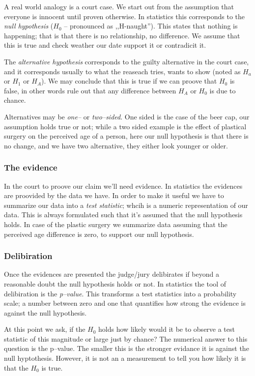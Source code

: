 A real world analogy is a court case. We start out from the assumption that
everyone is innocent until proven otherwise. In statistics this corresponds to
the \emph{null hypothesis}  ($H_0$ -- pronounced as ,,H-naught''). This states
that nothing is happening; that is that there is no relationship, no difference.
We assume that this is true and check weather our date support it or contradicit
it.

The \emph{alternative hypothesis} corresponds to the guilty alternative in the
court case, and it corresponds usually to what the reaseach tries, wants to
show (noted as $H_a$ or $H_1$ or $H_A$). We may conclude that this is true if we
can proove that $H_0$ is false, in other words rule out that any difference
between $H_A$ or $H_0$ is due to chance.

Alternatives may be \emph{one--} or \emph{two--sided}. One sided is the case of
the beer cap, our assumption holds true or not; while a two sided example is the
effect of plastical surgery on the perceived age of a person, here our null
hypothesis is that there is no change, and we have two alternative, they either
look younger or older.

\subsubsection{The evidence}
In the court to proove our claim we'll need evidence. In statistics the
evidences are proovided by the data we have. In order to make it useful we have
to summarize our data into a \emph{test statistic}; whcih is a numeric
representation of our data. This is always formulated such that it's assumed
that the null hypothesis holds. In case of the plastic surgery we summarize data
assuming that the perceived age difference is zero, to support our null
hypothesis.

\subsubsection{Delibiration}
Once the evidences are presented the judge/jury delibirates if beyond a
reasonable doubt the null hypothesis holds or not. In statistics the tool of
delibiration is the \emph{p--value}. This transforms a test statistics into a
probability scale; a number between zero and one that quantifies how strong the
evidence is against the null hypothesis.

At this point we ask, if the $H_0$ holds how likely would it be to observe a
test statistic of this magnitude or large just by chance? The numerical answer
to this question is the p--value. The smaller this is the stronger evidance it
is against the null hyptothesis. However, it is not an a measurement to tell you
how likely it is that the $H_0$ is true.

